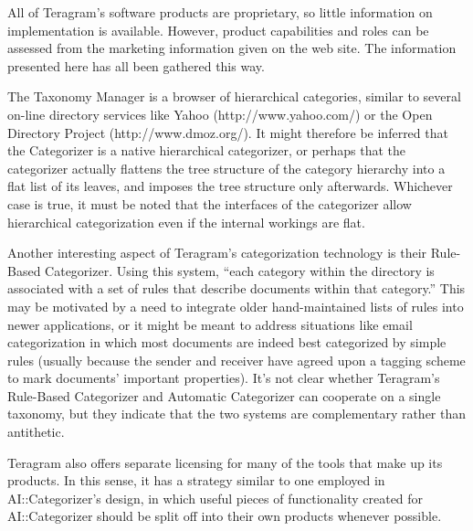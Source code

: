 All of Teragram's software products are proprietary, so little
information on implementation is available.  However, product
capabilities and roles can be assessed from the marketing information
given on the web site.  The information presented here has all been
gathered this way.

The Taxonomy Manager is a browser of hierarchical categories, similar
to several on-line directory services like Yahoo
(http://www.yahoo.com/) or the Open Directory Project
(http://www.dmoz.org/).  It might therefore be inferred that the
Categorizer is a native hierarchical categorizer, or perhaps that the
categorizer actually flattens the tree structure of the category
hierarchy into a flat list of its leaves, and imposes the tree
structure only afterwards.  Whichever case is true, it must be noted
that the interfaces of the categorizer allow hierarchical
categorization even if the internal workings are flat.

Another interesting aspect of Teragram's categorization technology is
their Rule-Based Categorizer.  Using this system, ``each category
within the directory is associated with a set of rules that describe
documents within that category.''  This may be motivated by a need to
integrate older hand-maintained lists of rules into newer
applications, or it might be meant to address situations like email
categorization in which most documents are indeed best categorized by
simple rules (usually because the sender and receiver have agreed upon
a tagging scheme to mark documents' important properties).  It's not
clear whether Teragram's Rule-Based Categorizer and Automatic
Categorizer can cooperate on a single taxonomy, but they indicate that
the two systems are complementary rather than antithetic.

Teragram also offers separate licensing for many of the tools that
make up its products.  In this sense, it has a strategy similar to one
employed in AI::Categorizer's design, in which useful pieces of
functionality created for AI::Categorizer should be split off into
their own products whenever possible.

